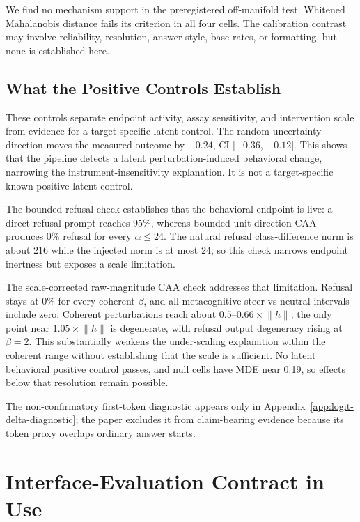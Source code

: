 \documentclass[sigconf]{acmart}
\begin{document}
We find no mechanism support in the preregistered off-manifold test. Whitened Mahalanobis distance fails its criterion in all four cells. The calibration contrast may involve reliability, resolution, answer style, base rates, or formatting, but none is established here.

\subsection{What the Positive Controls Establish}
\label{sec:positive-controls}

These controls separate endpoint activity, assay sensitivity, and intervention scale from evidence for a target-specific latent control. The random uncertainty direction moves the measured outcome by \(-0.24\), CI [\(-0.36\), \(-0.12\)]. This shows that the pipeline detects a latent perturbation-induced behavioral change, narrowing the instrument-insensitivity explanation. It is not a target-specific known-positive latent control.

The bounded refusal check establishes that the behavioral endpoint is live: a direct refusal prompt reaches 95\%, whereas bounded unit-direction CAA produces 0\% refusal for every \(\alpha\le24\). The natural refusal class-difference norm is about 216 while the injected norm is at most 24, so this check narrows endpoint inertness but exposes a scale limitation.

The scale-corrected raw-magnitude CAA check addresses that limitation. Refusal stays at 0\% for every coherent \(\beta\), and all metacognitive steer-vs-neutral intervals include zero. Coherent perturbations reach about \(0.5\)--\(0.66\times\lVert h\rVert\); the only point near \(1.05\times\lVert h\rVert\) is degenerate, with refusal output degeneracy rising at \(\beta=2\). This substantially weakens the under-scaling explanation within the coherent range without establishing that the scale is sufficient. No latent behavioral positive control passes, and null cells have MDE near 0.19, so effects below that resolution remain possible.

The non-confirmatory first-token diagnostic appears only in Appendix~\ref{app:logit-delta-diagnostic}; the paper excludes it from claim-bearing evidence because its token proxy overlaps ordinary answer starts.

\section{Interface-Evaluation Contract in Use}
\label{sec:design-implications}
\end{document}
